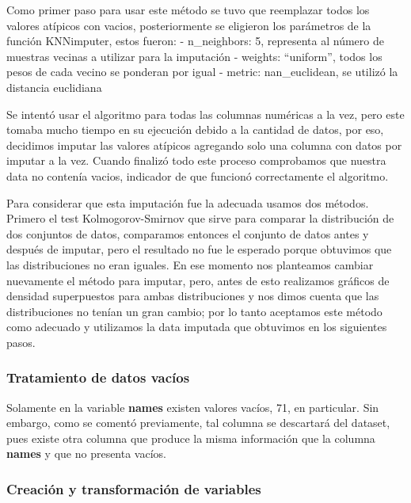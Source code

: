 \documentclass[
  letterpaper,
  DIV=11,
  numbers=noendperiod]{scrartcl}
\begin{document}
Como primer paso para usar este método se tuvo que reemplazar todos los
valores atípicos con vacios, posteriormente se eligieron los parámetros
de la función KNNimputer, estos fueron: - n\_neighbors: 5, representa al
número de muestras vecinas a utilizar para la imputación - weights:
``uniform'', todos los pesos de cada vecino se ponderan por igual -
metric: nan\_euclidean, se utilizó la distancia euclidiana

Se intentó usar el algoritmo para todas las columnas numéricas a la vez,
pero este tomaba mucho tiempo en su ejecución debido a la cantidad de
datos, por eso, decidimos imputar las valores atípicos agregando solo
una columna con datos por imputar a la vez. Cuando finalizó todo este
proceso comprobamos que nuestra data no contenía vacios, indicador de
que funcionó correctamente el algoritmo.

Para considerar que esta imputación fue la adecuada usamos dos métodos.
Primero el test Kolmogorov-Smirnov que sirve para comparar la
distribución de dos conjuntos de datos, comparamos entonces el conjunto
de datos antes y después de imputar, pero el resultado no fue le
esperado porque obtuvimos que las distribuciones no eran iguales. En ese
momento nos planteamos cambiar nuevamente el método para imputar, pero,
antes de esto realizamos gráficos de densidad superpuestos para ambas
distribuciones y nos dimos cuenta que las distribuciones no tenían un
gran cambio; por lo tanto aceptamos este método como adecuado y
utilizamos la data imputada que obtuvimos en los siguientes pasos.

\hypertarget{tratamiento-de-datos-vacuxedos}{%
\subsubsection{Tratamiento de datos
vacíos}\label{tratamiento-de-datos-vacuxedos}}

Solamente en la variable \textbf{names} existen valores vacíos, 71, en
particular. Sin embargo, como se comentó previamente, tal columna se
descartará del dataset, pues existe otra columna que produce la misma
información que la columna \textbf{names} y que no presenta vacíos.

\hypertarget{creaciuxf3n-y-transformaciuxf3n-de-variables}{%
\subsubsection{Creación y transformación de
variables}\label{creaciuxf3n-y-transformaciuxf3n-de-variables}}
\end{document}
